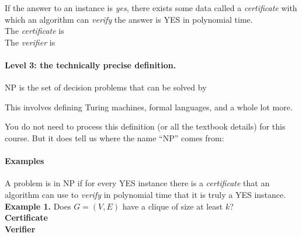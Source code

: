 \documentclass[11  pt]{article}
\begin{document}
	If the answer to an instance is \emph{yes}, there exists some data called a \emph{certificate} with which an algorithm can \emph{verify} the answer is YES in polynomial time. \\
	
	The \emph{certificate} is \\%
	
	
	The \emph{verifier} is  \\ %
	
	
	\newpage
	\paragraph{Level 3: the technically precise definition.}
	NP is the set of decision problems that can be solved by 
	
		\vs{2cm}
		
	This involves defining Turing machines, formal languages, and a whole lot more.

	\vs{2cm}
	
	You do not need to process this definition (or all the textbook details) for this course. But it does tell us where the name ``NP'' comes from:\\
	
	
	
	\newpage
	
	\paragraph{Examples}
	A problem is in NP if for every YES instance there is a \emph{certificate} that an algorithm can use to \emph{verify} in polynomial time that it is truly a YES instance. \\
	
	\textbf{Example 1.} Does $G = (V,E)$ have a clique of size at least $k$? \\
	
	\textbf{Certificate} \\%
	
	
	\textbf{Verifier} \\ %
	
\end{document}
